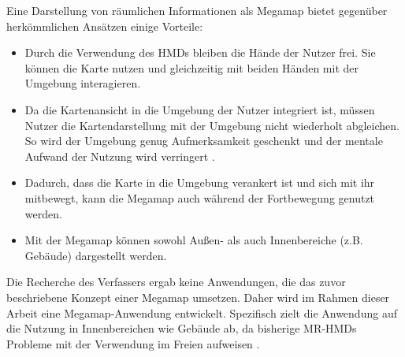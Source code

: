 %

Eine Darstellung von räumlichen Informationen als Megamap bietet gegenüber herkömmlichen Ansätzen einige Vorteile:
\begin{itemize}
    \item Durch die Verwendung des HMDs bleiben die Hände der Nutzer frei. %
    Sie können die Karte nutzen und gleichzeitig mit beiden Händen mit der Umgebung interagieren.

    \item Da die Kartenansicht in die Umgebung der Nutzer integriert ist, müssen Nutzer die Kartendarstellung mit der Umgebung nicht wiederholt abgleichen. %
    So wird der Umgebung genug Aufmerksamkeit geschenkt und der mentale Aufwand der Nutzung wird verringert \parencite{Bark2014, Narzt2006, Kim2009}.

    \item Dadurch, dass die Karte in die Umgebung verankert ist und sich mit ihr mitbewegt, kann die Megamap auch während der Fortbewegung genutzt werden.

    \item Mit der Megamap können sowohl Außen- als auch Innenbereiche (z.B. Gebäude) dargestellt werden.
\end{itemize}

Die Recherche des Verfassers ergab keine Anwendungen, die das zuvor beschriebene Konzept einer Megamap umsetzen.
Daher wird im Rahmen dieser Arbeit eine Megamap-Anwendung entwickelt.
Spezifisch zielt die Anwendung auf die Nutzung in Innenbereichen wie Gebäude ab, da bisherige MR-HMDs Probleme mit der Verwendung im Freien aufweisen \parencite{Schroeder2017, Strange2018}.

